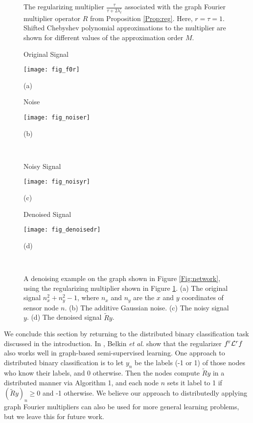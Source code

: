 \documentclass[conference]{IEEEtran}
\renewcommand{\l}{\ell}
\renewcommand{\L}{{\mathcal{L}}}
\newcommand{\transpose}{{\!\scriptscriptstyle\mathrm T}}
\def\L{{\cal L}}
\begin{document}
\begin{figure}
\caption{The regularizing multiplier $\frac{\tau}{\tau+2\lambda_{\l}^r}$ associated with the graph Fourier multiplier operator $R$ from Proposition \ref{Prop:reg}. Here, $r=\tau=1$. Shifted Chebyshev polynomial approximations to the multiplier are shown for different values of the approximation order $M$.} \label{Fig:filter}
\end{figure}
\begin{figure}[tb]
\centering
\begin{minipage}[b]{0.43\linewidth}
   \centering
   \centerline{\small{Original Signal}}
   \centerline{\texttt{[image: fig\_f0r]}}
\centerline{\small{(a)}}
\end{minipage}
\hfill
\begin{minipage}[b]{0.43\linewidth}
   \centering
   \centerline{\small{Noise}}
   \centerline{\texttt{[image: fig\_noiser]}}
\centerline{\small{(b)}}
\end{minipage}\\
\vspace{0.4cm}
\begin{minipage}[b]{0.43\linewidth}
   \centering
   \centerline{\small{Noisy Signal}}
   \centerline{\texttt{[image: fig\_noisyr]}}
\centerline{\small{(c)}}
\end{minipage}
\hfill
\begin{minipage}[b]{0.43\linewidth}
   \centering
   \centerline{\small{Denoised Signal}}
   \centerline{\texttt{[image: fig\_denoisedr]}}
\centerline{\small{(d)}}
\end{minipage}\\
\caption {A denoising example on the graph shown in Figure \ref{Fig:network}, using the regularizing multiplier shown in Figure \ref{Fig:filter}. (a) The original signal $n_x^2+n_y^2-1$, where $n_x$ and $n_y$ are the $x$ and $y$ coordinates of sensor node $n$. (b) The additive Gaussian noise. (c) The noisy signal $y$. (d) The denoised signal $\tilde{R}y$.}
  \label{Fig:denoising}
\end{figure}


We conclude this section by returning to the distributed binary classification task discussed in the introduction. In \cite{belkin_matveeva}, Belkin \emph{et al.} show that the regularizer $f^{\transpose}\L^r f$ also works well in graph-based semi-supervised learning. One approach to distributed binary classification is to let $y_n$ be the labels (-1 or 1) of those nodes who know their labels, and 0 otherwise. Then the nodes compute $\tilde{R}y$ in a distributed manner via Algorithm 1, and each node $n$ sets it label to 1 if
$(\tilde{R}y)_n \geq 0$ and -1 otherwise. We believe our approach to distributedly applying graph Fourier multipliers can also be used
for more general learning problems, but we leave this for future work.
\end{document}

